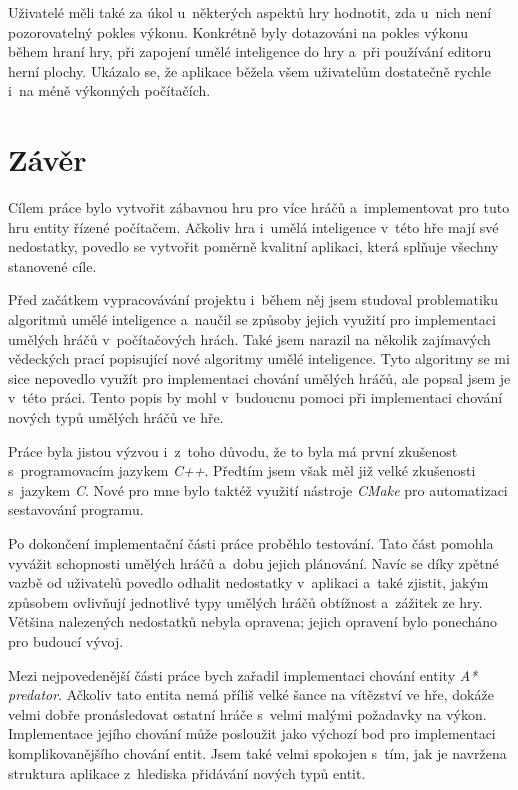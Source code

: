 Uživatelé měli také za úkol u~některých aspektů hry hodnotit, zda u~nich není pozorovatelný pokles výkonu. Konkrétně byly dotazováni na pokles výkonu během hraní hry, při zapojení umělé inteligence do hry a~při používání editoru herní plochy. Ukázalo se, že aplikace běžela všem uživatelům dostatečně rychle i~na méně výkonných počítačích.


\chapter{Závěr}

Cílem práce bylo vytvořit zábavnou hru pro více hráčů a~implementovat pro tuto hru entity řízené počítačem. Ačkoliv hra i~umělá inteligence v~této hře mají své nedostatky, povedlo se vytvořit poměrně kvalitní aplikaci, která splňuje všechny stanovené cíle.

Před začátkem vypracovávání projektu i~během něj jsem studoval problematiku algoritmů umělé inteligence a~naučil se způsoby jejich využití pro implementaci umělých hráčů v~počítačových hrách. Také jsem narazil na několik zajímavých vědeckých prací popisující nové algoritmy umělé inteligence. Tyto algoritmy se mi sice nepovedlo využít pro implementaci chování umělých hráčů, ale popsal jsem je v~této práci. Tento popis by mohl v~budoucnu pomoci při implementaci chování nových typů umělých hráčů ve hře.

Práce byla jistou výzvou i~z~toho důvodu, že to byla má první zkušenost s~programovacím jazykem \emph{C++}. Předtím jsem však měl již velké zkušenosti s~jazykem \emph{C}. Nové pro mne bylo taktéž využití nástroje \emph{CMake} pro automatizaci sestavování programu.

Po dokončení implementační části práce proběhlo testování. Tato část pomohla vyvážit schopnosti umělých hráčů a~dobu jejich plánování. Navíc se díky zpětné vazbě od uživatelů povedlo odhalit nedostatky v~aplikaci a~také zjistit, jakým způsobem ovlivňují jednotlivé typy umělých hráčů obtížnost a~zážitek ze hry. Většina nalezených nedostatků nebyla opravena; jejich opravení bylo ponecháno pro budoucí vývoj.

Mezi nejpovedenější části práce bych zařadil implementaci chování entity \emph{A* predator}. Ačkoliv tato entita nemá příliš velké šance na vítězství ve hře, dokáže velmi dobře pronásledovat ostatní hráče s~velmi malými požadavky na výkon. Implementace jejího chování může posloužit jako výchozí bod pro implementaci komplikovanějšího chování entit. Jsem také velmi spokojen s~tím, jak je navržena struktura aplikace z~hlediska přidávání nových typů entit.

